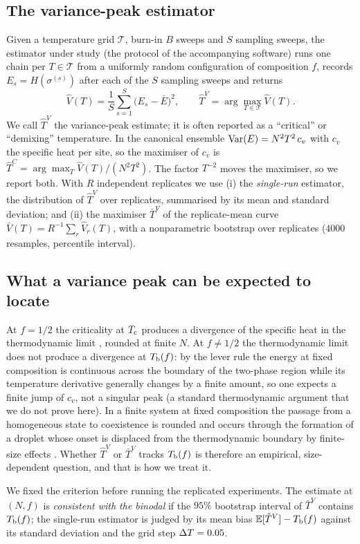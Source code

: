 \subsection{The variance-peak estimator}
Given a temperature grid $\mathcal T$, burn-in $B$ sweeps and $S$ sampling sweeps, the estimator under study (the protocol of the accompanying software) runs one chain per $T\in\mathcal T$ from a uniformly random configuration of composition $f$, records $E_s=H(\sigma^{(s)})$ after each of the $S$ sampling sweeps and returns
\begin{equation}
\hat V(T)=\frac{1}{S}\sum_{s=1}^{S}\big(E_s-\bar E\big)^2,\qquad
\hat T^{V}=\arg\max_{T\in\mathcal T}\hat V(T).
\label{eq:estimator}
\end{equation}
We call $\hat T^{V}$ the variance-peak estimate; it is often reported as a ``critical'' or ``demixing'' temperature. In the canonical ensemble $\mathrm{Var}(E)=N^2T^2\,c_v$ with $c_v$ the specific heat per site, so the maximiser of $c_v$ is $\hat T^{C}=\arg\max_T \hat V(T)/(N^2T^2)$. The factor $T^{-2}$ moves the maximiser, so we report both. With $R$ independent replicates we use (i) the \emph{single-run} estimator, the distribution of $\hat T^{V}$ over replicates, summarised by its mean and standard deviation; and (ii) the maximiser $\bar T^{V}$ of the replicate-mean curve $\bar V(T)=R^{-1}\sum_r\hat V_r(T)$, with a nonparametric bootstrap over replicates \citep{efron1979} ($4000$ resamples, percentile interval).

\subsection{What a variance peak can be expected to locate}
At $f=1/2$ the criticality at $T_{\mathrm c}$ produces a divergence of the specific heat in the thermodynamic limit \citep{onsager1944}, rounded at finite $N$. At $f\ne1/2$ the thermodynamic limit does not produce a divergence at $T_{\mathrm b}(f)$: by the lever rule the energy at fixed composition is continuous across the boundary of the two-phase region while its temperature derivative generally changes by a finite amount, so one expects a finite jump of $c_v$, not a singular peak (a standard thermodynamic argument that we do not prove here). In a finite system at fixed composition the passage from a homogeneous state to coexistence is rounded and occurs through the formation of a droplet whose onset is displaced from the thermodynamic boundary by finite-size effects \citep{binder1987,biskup2002}. Whether $\hat T^V$ or $\bar T^V$ tracks $T_{\mathrm b}(f)$ is therefore an empirical, size-dependent question, and that is how we treat it.

We fixed the criterion before running the replicated experiments. The estimate at $(N,f)$ is \emph{consistent with the binodal} if the $95\%$ bootstrap interval of $\bar T^{V}$ contains $T_{\mathrm b}(f)$; the single-run estimator is judged by its mean bias $\mathbb{E}[\hat T^V]-T_{\mathrm b}(f)$ against its standard deviation and the grid step $\Delta T=0.05$.
